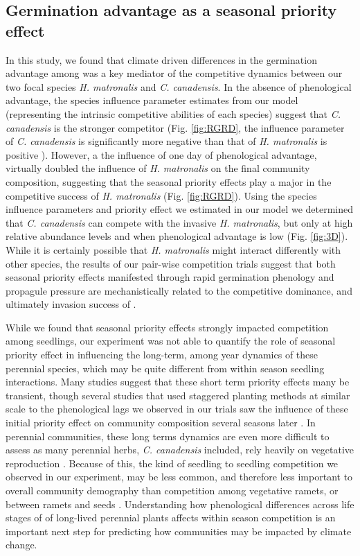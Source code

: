 \documentclass{article}\usepackage[]{graphicx}\usepackage[]{color}
\begin{document}
{\subsection*{Germination advantage as a seasonal priority effect} 
In this study, we found that climate driven differences in the germination advantage among was a key mediator of the competitive dynamics  between our two focal species \textit{H. matronalis} and \textit{C. canadensis}. In the absence of phenological advantage, the species influence parameter estimates from our model (representing the intrinsic competitive abilities of each species) suggest that \textit{C. canadensis} is the stronger competitor (Fig. \ref{fig:RGRD}, the influence parameter of \textit{C. canadensis} is significantly more negative than that of \textit{H. matronalis} is positive ). However, a the influence of one day of phenological advantage, virtually doubled the influence of \textit{H. matronalis} on the final community composition, suggesting that the seasonal priority effects play a major in the competitive success of \textit{H. matronalis} (Fig. \ref{fig:RGRD}). Using the species influence parameters and priority effect we estimated in our model we determined that \textit{C. canadensis} can compete with the invasive \textit{H. matronalis}, but only at high relative abundance levels and when phenological advantage is low (Fig. \ref{fig:3D}). While it is certainly possible that \textit{H. matronalis} might interact differently with other species, the results of our pair-wise competition trials suggest that both seasonal priority effects manifested through rapid germination phenology and propagule pressure are mechanistically related to the competitive dominance, and ultimately invasion success of .

While we found that seasonal priority effects strongly impacted competition among seedlings, our experiment was not able to quantify the role of seasonal priority effect in influencing the long-term, among year dynamics of these perennial species, which may be quite different from within season seedling interactions. Many studies suggest that these short term priority effects many be transient, though several studies that used staggered planting methods at similar scale to the phenological lags we observed in our trials saw the influence of these initial priority effect on community composition several seasons later \citep{}.  In perennial communities, these long terms dynamics are even more difficult to assess as many perennial herbs, \textit{C. canadensis} included, rely heavily on vegetative reproduction \citep{}. Because of this, the kind of seedling to seedling competition we observed in our experiment, may be less common, and therefore less important to overall community demography than competition among vegetative ramets, or between ramets and seeds \citep{}. Understanding how phenological differences across life stages of of long-lived perennial plants affects within season competition is an important next step for predicting how communities may be impacted by climate change.

}
\end{document}
